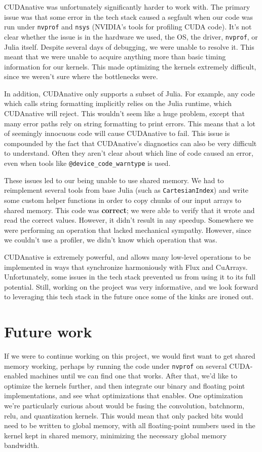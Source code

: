 \documentclass[12pt]{article}
\begin{document}
CUDAnative was unfortunately significantly harder to work with. The primary issue was that some error in the tech stack caused a segfault when our code was run under \texttt{nvprof} and \texttt{nsys} (NVIDIA's tools for profiling CUDA code). It's not clear whether the issue is in the hardware we used, the OS, the driver, \texttt{nvprof}, or Julia itself. Despite several days of debugging, we were unable to resolve it. This meant that we were unable to acquire anything more than basic timing information for our kernels. This made optimizing the kernels extremely difficult, since we weren't sure where the bottlenecks were.

In addition, CUDAnative only supports a subset of Julia. For example, any code which calls string formatting implicitly relies on the Julia runtime, which CUDAnative will reject. This wouldn't seem like a huge problem, except that many error paths rely on string formatting to print errors. This means that a lot of seemingly innocuous code will cause CUDAnative to fail.
 This issue is compounded by the fact that CUDAnative's diagnostics can also be very difficult to understand. Often they aren't clear about which line of code caused an error, even when tools like \texttt{@device\_code\_warntype} is used.

These issues led to our being unable to use shared memory. We had to reimplement several tools from base Julia (such as \texttt{CartesianIndex}) and write some custom helper functions in order to copy chunks of our input arrays to shared memory. This code was \textbf{correct}; we were able to verify that it wrote and read the correct values. However, it didn't result in any speedup. Somewhere we were performing an operation that lacked mechanical sympathy. However, since we couldn't use a profiler, we didn't know which operation that was.

CUDAnative is extremely powerful, and allows many low-level operations to be implemented in ways that synchronize harmoniously with Flux and CuArrays. Unfortunately, some issues in the tech stack prevented us from using it to its full potential. Still, working on the project was very informative, and we look forward to leveraging this tech stack in the future once some of the kinks are ironed out.

\section{Future work}
\label{sec:orgfb3256a}
If we were to continue working on this project, we would first want to get shared memory working, perhaps by running the code under \texttt{nvprof} on several CUDA-enabled machines until we can find one that works.
After that, we'd like to optimize the kernels further, and then integrate our binary and floating point implementations, and see what optimizations that enables.
One optimization we're particularly curious about would be fusing the convolution, batchnorm, relu, and quantization kernels. This would mean that only packed bits would need to be written to global memory, with all floating-point numbers used in the kernel kept in shared memory, minimizing the necessary global memory bandwidth.
\end{document}
